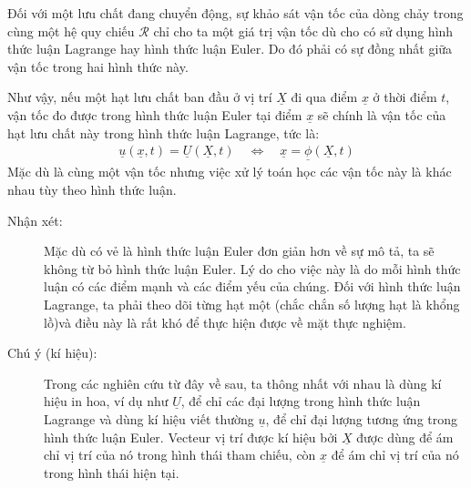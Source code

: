 \documentclass[../../../main.tex]{subfiles}
\begin{document}
    Đối với một lưu chất đang chuyển động, sự khảo sát vận tốc của dòng chảy trong cùng một hệ quy chiếu $\mathcal{R}$ chỉ cho ta một giá trị vận tốc dù cho có sử dụng hình thức luận Lagrange hay hình thức luận Euler. Do đó phải có sự đồng nhất giữa vận tốc trong hai hình thức này.
    
    Như vậy, nếu một hạt lưu chất ban đầu ở vị trí $\underline{X}$ đi qua điểm $\underline{x}$ ở thời điểm $t$, vận tốc đo được trong hình thức luận Euler tại điểm $\underline{x}$ sẽ chính là vận tốc của hạt lưu chất này trong hình thức luận Lagrange, tức là:
    	\begin{align}
    		\underline{u}\left(\underline{x},t\right)=\underline{U}\left(\underline{X},t\right)\quad\Longleftrightarrow \quad\underline{x}=\underline{\phi}\left(\underline{X},t\right)
    	\end{align}
    Mặc dù là cùng một vận tốc nhưng việc xử lý toán học các vận tốc này là khác nhau tùy theo hình thức luận.

    \begin{description}
        \item[Nhận xét:] Mặc dù có vẻ là hình thức luận Euler đơn giản hơn về sự mô tả, ta sẽ không từ bỏ hình thức luận Euler. Lý do cho việc này là do mỗi hình thức luận có các điểm mạnh và các điểm yếu của chúng. Đối với hình thức luận Lagrange, ta phải theo dõi từng hạt một (chắc chắn số lượng hạt là khổng lồ)và điều này là rất khó để thực hiện được về mặt thực nghiệm.
        \item[Chú ý (kí hiệu):] Trong các nghiên cứu từ đây về sau, ta thông nhất với nhau là dùng kí hiệu in hoa, ví dụ như $\underline{U}$, để chỉ các đại lượng trong hình thức luận Lagrange và dùng kí hiệu viết thường $\underline{u}$, để chỉ đại lượng tương ứng trong hình thức luận Euler. Vecteur vị trí được kí hiệu bởi $\underline{X}$ được dùng để ám chỉ vị trí của nó trong hình thái tham chiếu, còn $\underline{x}$ để ám chỉ vị trí của nó trong hình thái hiện tại.
    \end{description}
\end{document}

